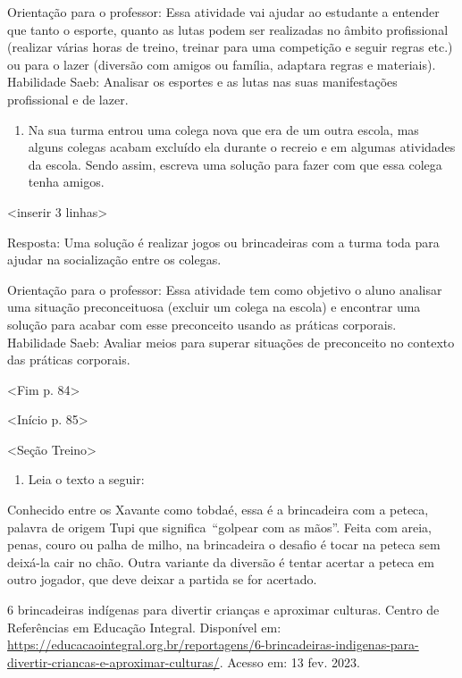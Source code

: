 Orientação para o professor: Essa atividade vai ajudar ao estudante a
entender que tanto o esporte, quanto as lutas podem ser realizadas no
âmbito profissional (realizar várias horas de treino, treinar para uma
competição e seguir regras etc.) ou para o lazer (diversão com amigos ou
família, adaptara regras e materiais). Habilidade Saeb: Analisar os
esportes e as lutas nas suas manifestações profissional e de lazer.

\begin{enumerate}
\def\labelenumi{\arabic{enumi}.}
\item
  Na sua turma entrou uma colega nova que era de um outra escola, mas
  alguns colegas acabam excluído ela durante o recreio e em algumas
  atividades da escola. Sendo assim, escreva uma solução para fazer com
  que essa colega tenha amigos.
\end{enumerate}

\textless{}inserir 3 linhas\textgreater{}

Resposta: Uma solução é realizar jogos ou brincadeiras com a turma toda
para ajudar na socialização entre os colegas.

Orientação para o professor: Essa atividade tem como objetivo o aluno
analisar uma situação preconceituosa (excluir um colega na escola) e
encontrar uma solução para acabar com esse preconceito usando as
práticas corporais. Habilidade Saeb: Avaliar meios para superar
situações de preconceito no contexto das práticas corporais.

\textless{}Fim p. 84\textgreater{}

\textless{}Início p. 85\textgreater{}

\textless{}Seção Treino\textgreater{}

\begin{enumerate}
\def\labelenumi{\arabic{enumi}.}
\item
  Leia o texto a seguir:
\end{enumerate}

Conhecido entre os Xavante como tobdaé, essa é a brincadeira com a
peteca, palavra de origem Tupi que significa~``golpear com as mãos''.
Feita com areia, penas, couro ou palha de milho, na brincadeira o
desafio é tocar na peteca sem deixá-la cair no chão. Outra variante da
diversão é tentar acertar a peteca em outro jogador, que deve deixar a
partida se for acertado.

6 brincadeiras indígenas para divertir crianças e aproximar culturas.
Centro de Referências em Educação Integral. Disponível em:
\url{https://educacaointegral.org.br/reportagens/6-brincadeiras-indigenas-para-divertir-criancas-e-aproximar-culturas/}.
Acesso em: 13 fev. 2023.

